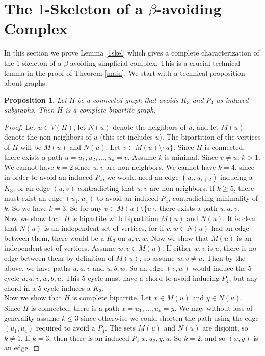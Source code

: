 \documentclass[letterpaper,12pt]{amsart}
\theoremstyle{plain}
\newtheorem{prop}[thm]{Proposition}
\theoremstyle{definition}
\theoremstyle{remark}
\begin{document}

\section{The $1$-Skeleton of a $\beta$-avoiding Complex}\label{sec:1skel}


In this section we prove Lemma \ref{1skel} which gives a complete characterization of the $1$-skeleton of a $\beta$-avoiding simplicial complex.
This is a crucial technical lemma in the proof of Theorem \ref{main}.
We start with a technical proposition about graphs.

\begin{prop}\label{bipartite}
	Let $H$ be a connected graph that avoids $K_3$ and $P_4$ as induced subgraphs.
	Then $H$ is a complete bipartite graph.
\end{prop}
\begin{proof}
	Let $u \in V(H)$, let $N(u)$ denote the neighbors of $u$,
	and let $M(u)$ denote the non-neighbors of $u$ (this set includes $u$).
	The bipartition of the vertices of $H$ will be $M(u)$ and $N(u)$.
	Let $v \in M(u)\setminus\{u\}$.
	Since $H$ is connected, there exists a path $u=u_1,u_2,\dots,u_k=v$.
	Assume $k$ is minimal.
	Since $v \neq u$, $k > 1$.
	We cannot have $k=2$ since $u,v$ are non-neighbors.
	We cannot have $k = 4$, since in order to avoid an induced $P_4$, we would need an edge $(u_i,u_{i+2})$ inducing a $K_3$,
	or an edge $(u,v)$ contradicting that $u,v$ are non-neighbors.
	If $k\ge 5$, there must exist an edge $(u_1,u_4)$ to avoid an induced $P_4$, contradicting minimality of $k$.
	So we have $k=3$.
	So for any $v\in M(u)\setminus\{u\}$, there exists a path $u,a,v$.
	\\
	\indent
	Now we show that $H$ is bipartite with bipartition $M(u)$ and $N(u)$.
	It is clear that $N(u)$ is an independent set of vertices, for if $v,w \in N(u)$ had an edge between them,
	there would be a $K_3$ on $u,v,w$.
	Now we show that $M(u)$ is an independent set of vertices.
	Assume $w,v\in M(u)$.
	If either $w,v$ is $u$, there is no edge between them by definition of $M(u)$, so assume $w,v \neq u$.
	Then by the above, we have paths $u,a,v$ and $u,b,w$.
	{ So an edge $(v,w)$ would induce the $5$-cycle $u,a,v,w,b,u$.
	This $5$-cycle must have a chord to avoid inducing $P_4$, but any chord in a $5$-cycle induces a $K_3$.}
	\\
	\indent
	Now we show that $H$ is complete bipartite.
	Let $x \in M(u)$ and $y \in N(u)$.
	Since $H$ is connected, there is a path $x=u_1,...,u_k=y$.
	We may without loss of generality assume $k\le 3$ since otherwise we could shorten the path using the edge $(u_1,u_4)$ required to avoid a $P_4$.
	The sets $M(u)$ and $N(u)$ are disjoint, so $k \neq 1$.
	If $k=3$, then there is an induced $P_4$ $x,u_2,y,u$.
	So $k=2$, and so $(x,y)$ is an edge.
\end{proof}
\end{document}
